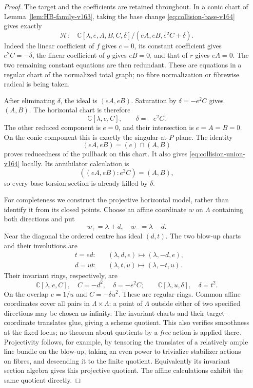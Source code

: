 \documentclass[11pt,reqno]{amsart}
\numberwithin{equation}{section}
\theoremstyle{definition}\newtheorem{definition}[theorem]{Definition}
\theoremstyle{remark}\newtheorem{remark}[theorem]{Remark}
\newcommand{\C}{\mathbb C}\newcommand{\Q}{\mathbb Q}
\begin{document}
\begin{proof}
The target and the coefficients are retained throughout. In a conic
chart of Lemma~\ref{lem:HB-family-v163}, taking the base change
\eqref{eq:collision-base-v164} gives exactly
\begin{equation}\label{eq:collision-chart-v164}
 \mathcal H:\quad
 \C[\lambda,e,A,B,C,\delta]/(eA,eB,e^2C+\delta).
\end{equation}
Indeed the linear coefficient of $f$ gives $c=0$, its constant
coefficient gives $e^2C=-\delta$, the linear coefficient of $g$
gives $eB=0$, and that of $r$ gives $eA=0$. The two remaining
constant equations are then redundant. These are equations in a
regular chart of the normalized total graph; no fibre normalization
or fibrewise radical is being taken.

After eliminating $\delta$, the ideal is $(eA,eB)$. Saturation by
$\delta=-e^2C$ gives $(A,B)$. The horizontal chart is therefore
\begin{equation}\label{eq:horizontal-chart-v164}
 \C[\lambda,e,C],\qquad \delta=-e^2C.
\end{equation}
The other reduced component is $e=0$, and their intersection is
$e=A=B=0$. On the conic component this is exactly the singular-at-$P$
plane. The identity
\[
            (eA,eB)=(e)\cap(A,B)
\]
proves reducedness of the pullback on this chart. It also gives
\eqref{eq:collision-union-v164} locally. Its annihilator calculation
is
\[
       ((eA,eB):e^2C)=(A,B),
\]
so every base-torsion section is already killed by $\delta$.

For completeness we construct the projective horizontal model,
rather than identify it from its closed points. Choose an affine
coordinate $w$ on $\Lambda$ containing both directions and put
\[
 w_+=\lambda+d,\quad w_-=\lambda-d.
\]
Near the diagonal the ordered centre has ideal $(d,t)$. The two
blow-up charts and their involutions are
\begin{align*}
 &t=ed: &&(\lambda,d,e)\longmapsto(\lambda,-d,e),\\
 &d=ut: &&(\lambda,t,u)\longmapsto(\lambda,-t,u).
\end{align*}
Their invariant rings, respectively, are
\begin{equation}\label{eq:invariant-charts-v164}
 \C[\lambda,e,C],\quad C=-d^2,\quad\delta=-e^2C;
 \qquad \C[\lambda,u,\delta],\quad\delta=t^2.
\end{equation}
On the overlap $e=1/u$ and $C=-\delta u^2$. These are regular
rings. Common affine coordinates cover all pairs in
$\Lambda\times\Lambda$: a point of $\Lambda$ outside either of
two specified directions may be chosen as infinity. The invariant
charts and their target-coordinate translates glue, giving a
scheme quotient. This also verifies smoothness at the fixed locus;
no theorem about quotients by a \emph{free} action is applied there.
Projectivity follows, for example, by tensoring the translates of
a relatively ample line bundle on the blow-up, taking an even power
to trivialize stabilizer actions on fibres, and descending it to the
finite quotient. Equivalently its invariant section algebra gives
this projective quotient. The affine calculations exhibit the same
quotient directly.


\end{proof}
\end{document}
